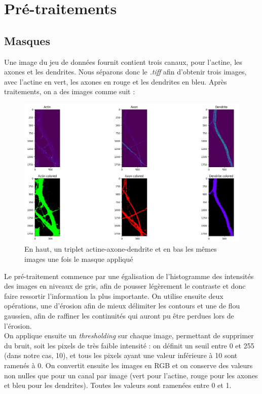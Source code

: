 \documentclass{report}
\begin{document}
\chapter{Pré-traitements}

\section{Masques}

Une image du jeu de données fournit contient trois canaux, pour l'actine, les axones
et les dendrites. Nous séparons donc le \textit{.tiff} afin d'obtenir trois images,
avec l'actine en vert, les axones en rouge et les dendrites en bleu. Après traitements,
on a des images comme suit :

\begin{figure}[H]
\centering
\includegraphics[scale=0.35]{"ex_mask"}
\caption{En haut, un triplet actine-axone-dendrite et en bas les mêmes images une fois le masque appliqué}
\end{figure}

Le pré-traitement commence par une égalisation de l'histogramme des intensités
des images en niveaux de gris, afin de pousser légèrement le contraste et donc faire
ressortir l'information la plus importante. On utilise ensuite deux opérations, une d'érosion
afin de mieux délimiter les contours et une de flou gaussien,
afin de raffiner les continuités qui auront pu être perdues lors de l'érosion. \\
On applique ensuite un \textit{thresholding} sur chaque image,
permettant de supprimer du bruit, soit les pixels de très faible intensité :
on définit un seuil entre 0 et 255 (dans notre cas, 10), et tous les pixels ayant
une valeur inférieure à 10 sont ramenés à 0. On convertit ensuite les images en
RGB et on conserve des valeurs non nulles que pour un canal par image (vert pour
l'actine, rouge pour les axones et bleu pour les dendrites). Toutes les valeurs
sont ramenées entre 0 et 1.
\end{document}
